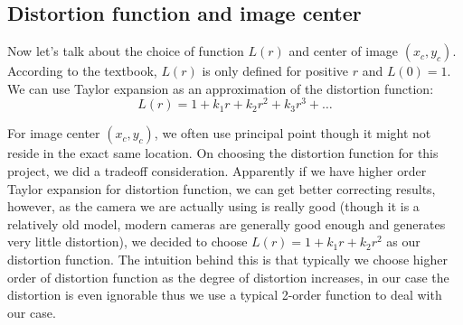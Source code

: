 \documentclass[conference]{IEEEtran}
\begin{document}
\subsection{Distortion function and image center}
Now let's talk about the choice of function $L(r)$ and center of image $(x_c, y_c)$. According to the textbook, $L(r)$ is only defined for positive $r$ and $L(0) = 1$. We can use Taylor expansion as an approximation of the distortion function:
\begin{equation}
	L(r) = 1 + k_1r + k_2r^2 + k_3r^3 + \dots
\end{equation}

For image center $(x_c, y_c)$, we often use principal point though it might not reside in the exact same location. On choosing the distortion function for this project, we did a tradeoff consideration. Apparently if we have higher order Taylor expansion for distortion function, we can get better correcting results, however, as the camera we are actually using is really good (though it is a relatively old model, modern cameras are generally good enough and generates very little distortion), we decided to choose $L(r) = 1 + k_1r + k_2r^2$ as our distortion function.
The intuition behind this is that typically we choose higher order of distortion function as the degree of distortion increases, in our case the distortion is even ignorable thus we use a typical 2-order function to deal with our case.
\end{document}
